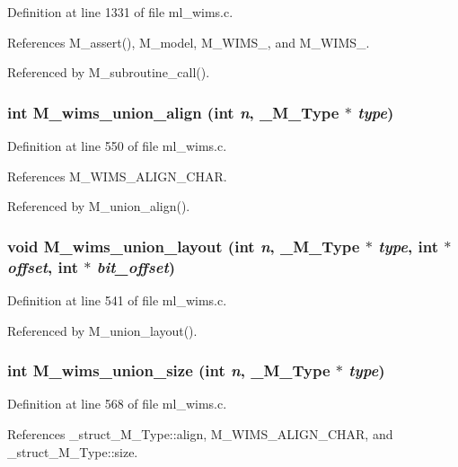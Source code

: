 Definition at line 1331 of file ml\_\-wims.c.

References M\_\-assert(), M\_\-model, M\_\-WIMS\_, and M\_\-WIMS\_.

Referenced by M\_\-subroutine\_\-call().
\subsubsection{\setlength{\rightskip}{0pt plus 5cm}int M\_\-wims\_\-union\_\-align (int {\em n}, \bf{\_\-M\_\-Type} $\ast$ {\em type})}\label{ml__wims_8c_b39ca8b04b697536e7f8e25b1688bfb7}




Definition at line 550 of file ml\_\-wims.c.

References M\_\-WIMS\_\-ALIGN\_\-CHAR.

Referenced by M\_\-union\_\-align().
\subsubsection{\setlength{\rightskip}{0pt plus 5cm}void M\_\-wims\_\-union\_\-layout (int {\em n}, \bf{\_\-M\_\-Type} $\ast$ {\em type}, int $\ast$ {\em offset}, int $\ast$ {\em bit\_\-offset})}\label{ml__wims_8c_67eff361295f7bf737e710c3cd2d421f}




Definition at line 541 of file ml\_\-wims.c.

Referenced by M\_\-union\_\-layout().
\subsubsection{\setlength{\rightskip}{0pt plus 5cm}int M\_\-wims\_\-union\_\-size (int {\em n}, \bf{\_\-M\_\-Type} $\ast$ {\em type})}\label{ml__wims_8c_bda748cea405973937a4d5eaa170fddd}




Definition at line 568 of file ml\_\-wims.c.

References \_\-struct\_\-M\_\-Type::align, M\_\-WIMS\_\-ALIGN\_\-CHAR, and \_\-struct\_\-M\_\-Type::size.

